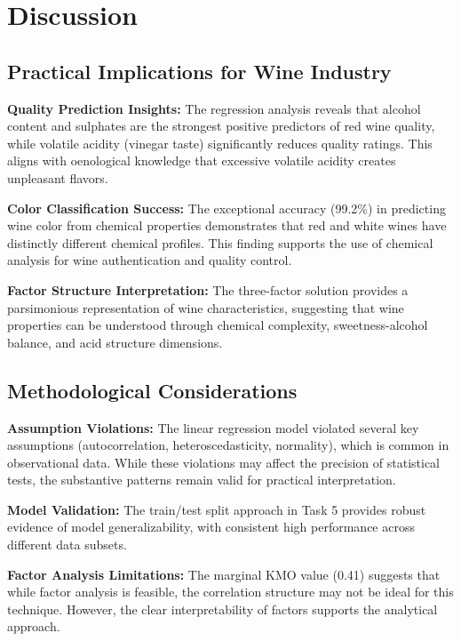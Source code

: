 \chapter{Discussion}

\section{Practical Implications for Wine Industry}

\textbf{Quality Prediction Insights:} The regression analysis reveals that alcohol content and sulphates are the strongest positive predictors of red wine quality, while volatile acidity (vinegar taste) significantly reduces quality ratings. This aligns with oenological knowledge that excessive volatile acidity creates unpleasant flavors.

\textbf{Color Classification Success:} The exceptional accuracy (99.2\%) in predicting wine color from chemical properties demonstrates that red and white wines have distinctly different chemical profiles. This finding supports the use of chemical analysis for wine authentication and quality control.

\textbf{Factor Structure Interpretation:} The three-factor solution provides a parsimonious representation of wine characteristics, suggesting that wine properties can be understood through chemical complexity, sweetness-alcohol balance, and acid structure dimensions.

\section{Methodological Considerations}

\textbf{Assumption Violations:} The linear regression model violated several key assumptions (autocorrelation, heteroscedasticity, normality), which is common in observational data. While these violations may affect the precision of statistical tests, the substantive patterns remain valid for practical interpretation.

\textbf{Model Validation:} The train/test split approach in Task 5 provides robust evidence of model generalizability, with consistent high performance across different data subsets.

\textbf{Factor Analysis Limitations:} The marginal KMO value (0.41) suggests that while factor analysis is feasible, the correlation structure may not be ideal for this technique. However, the clear interpretability of factors supports the analytical approach.

